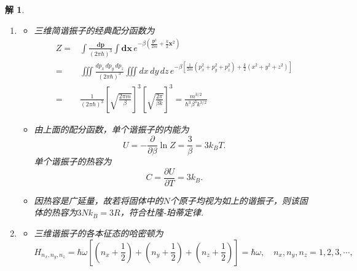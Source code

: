 \documentclass[UTF8,10pt,a4paper]{article}
\theoremstyle{Problem}
\theoremstyle{Solution}
\newtheorem*{sol}{解}
\begin{document}
\begin{sol}
    \begin{enumerate}
        \item[(a)]
              \begin{itemize}
                  \item[$\triangleright$] 三维简谐振子的经典配分函数为
                        \begin{align}
                            \nonumber Z= & \int\frac{\bm{dp}}{(2\pi\hbar)^3}\int\bm{dx}\,e^{-\beta\left(\frac{\bm{p}^2}{2m}+\frac{k}{2}\bm{x}^2\right)}                                                        \\
                            \nonumber=   & \iiint\frac{dp_x\,dp_y\,dp_z}{(2\pi\hbar)^3}\iiint dx\,dy\,dz\,e^{-\beta\left[\frac{1}{2m}\left(p_x^2+p_y^2+p_z^2\right)+\frac{k}{2}\left(x^2+y^2+z^2\right)\right]} \\
                            =   & \frac{1}{(2\pi\hbar)^3}\left[\sqrt{\frac{2\pi m}{\beta}}\right]^3\left[\sqrt{\frac{2\pi}{\beta k}}\right]^3=\frac{m^{3/2}}{\hbar^3\beta^3k^{3/2}}
                        \end{align}
                  \item[$\triangleright$] 由上面的配分函数，单个谐振子的内能为
                        \begin{equation}
                            U=-\frac{\partial}{\partial\beta}\ln Z=\frac{3}{\beta}=3k_BT.
                        \end{equation}
                        单个谐振子的热容为
                        \begin{equation}
                            C=\frac{\partial U}{\partial T}=3k_B.
                        \end{equation}
                  \item[$\triangleright$] 因热容是广延量，故若将固体中的$N$个原子均视为如上的谐振子，则该固体的热容为$3Nk_B=3R$，符合杜隆-珀蒂定律.
              \end{itemize}
        \item[(b)] \begin{itemize}
                  \item[$\triangleright$] 三维谐振子的各本征态的哈密顿为
                        \begin{equation}
                            H_{n_x,n_y,n_z}=\hbar\omega\left[\left(n_x+\frac{1}{2}\right)+\left(n_y+\frac{1}{2}\right)+\left(n_z+\frac{1}{2}\right)\right]=\hbar\omega,\quad n_x,n_y,n_z=1,2,3,\cdots,
                        \end{equation}

\end{itemize}
\end{enumerate}
\end{sol}
\end{document}
